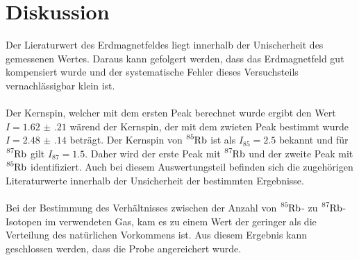 \section{Diskussion}
\label{sec:Diskussion}
Der Lieraturwert des Erdmagnetfeldes liegt innerhalb der Unischerheit des gemessenen Wertes.
Daraus kann gefolgert werden, dass das Erdmagnetfeld gut kompensiert wurde und der 
systematische Fehler dieses Versuchsteils vernachlässigbar klein ist.\\\\
Der Kernspin, welcher mit dem ersten Peak berechnet wurde ergibt den Wert $I=\num{1.62(21)}$ 
wärend der Kernspin, der mit dem zwieten Peak bestimmt wurde $I=\num{2.48(14)}$ beträgt.
Der Kernspin von $\ce{^85Rb}$ ist als $I_{85}=\num{2.5}$ bekannt und für 
$\ce{^87Rb}$ gilt $I_{87}=\num{1.5}$.
Daher wird der erste Peak mit $\ce{^87Rb}$ und der zweite Peak mit $\ce{^85Rb}$
identifiziert.
Auch bei diesem Auswertungsteil befinden sich die zugehörigen Literaturwerte 
innerhalb der Unsicherheit der bestimmten Ergebnisse.\\\\
Bei der Bestimmung des Verhältnisses zwischen der Anzahl von $\ce{^85Rb}$- zu $\ce{^87Rb}$-Isotopen
im verwendeten Gas, kam es zu einem Wert der geringer als die Verteilung des natürlichen 
Vorkommens ist. Aus diesem Ergebnis kann geschlossen werden, dass die Probe 
angereichert wurde.
\newpage
